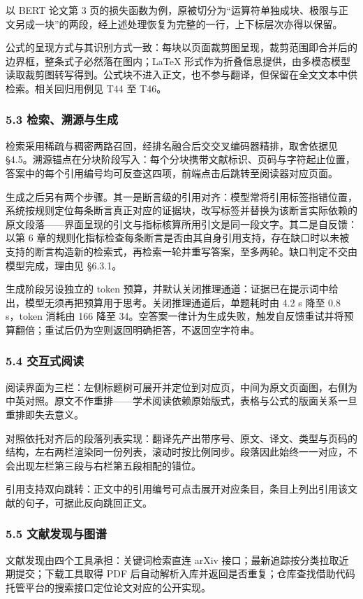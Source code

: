 \documentclass[UTF8,fontset=windows,zihao=5,a4paper]{ctexart}
\begin{document}
以 BERT 论文第 3 页的损失函数为例，原被切分为“运算符单独成块、极限与正文另成一块”的两段，经上述处理恢复为完整的一行，上下标层次亦得以保留。

公式的呈现方式与其识别方式一致：每块以页面裁剪图呈现，裁剪范围即合并后的边界框，整条式子必然落在图内；LaTeX 形式作为折叠信息提供，由多模态模型读取裁剪图转写得到。公式块不进入正文，也不参与翻译，但保留在全文文本中供检索。相关回归用例见 T44 至 T46。

\subsubsection*{5.3 检索、溯源与生成}
检索采用稀疏与稠密两路召回，经排名融合后交交叉编码器精排，取舍依据见 §4.5。溯源锚点在分块阶段写入：每个分块携带文献标识、页码与字符起止位置，答案中的每个引用编号均可反查这四项，前端点击后跳转至阅读器对应页面。

生成之后另有两个步骤。其一是断言级的引用对齐：模型常将引用标签指错位置，系统按规则定位每条断言真正对应的证据块，改写标签并替换为该断言实际依赖的原文段落——界面呈现的引文与指标核算所用引文是同一段文字。其二是自反馈：以第 6 章的规则化指标检查每条断言是否由其自身引用支持，存在缺口时以未被支持的断言构造新的检索式，再检索一轮并重写答案，至多两轮。缺口判定不交由模型完成，理由见 §6.3.1。

生成阶段另设独立的 token 预算，并默认关闭推理通道：证据已在提示词中给出，模型无须再把预算用于思考。关闭推理通道后，单题耗时由 4.2 s 降至 0.8 s，token 消耗由 166 降至 34。空答案一律计为生成失败，触发自反馈重试并将预算翻倍；重试后仍为空则返回明确拒答，不返回空字符串。

\subsubsection*{5.4 交互式阅读}
阅读界面为三栏：左侧标题树可展开并定位到对应页，中间为原文页面图，右侧为中英对照。原文不作重排——学术阅读依赖原始版式，表格与公式的版面关系一旦重排即失去意义。

对照依托对齐后的段落列表实现：翻译先产出带序号、原文、译文、类型与页码的结构，左右两栏渲染同一份列表，滚动时按比例同步。段落因此始终一一对应，不会出现左栏第三段与右栏第五段相配的错位。

引用支持双向跳转：正文中的引用编号可点击展开对应条目，条目上列出引用该文献的句子，可据此反向跳回正文。

\subsubsection*{5.5 文献发现与图谱}
文献发现由四个工具承担：关键词检索直连 arXiv 接口；最新追踪按分类拉取近期提交；下载工具取得 PDF 后自动解析入库并返回是否重复；仓库查找借助代码托管平台的搜索接口定位论文对应的公开实现。
\end{document}
